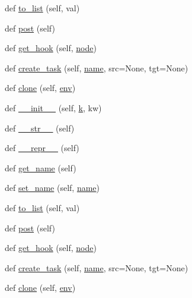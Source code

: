 \begin{DoxyCompactItemize}
\item 
def \hyperlink{classwaflib_1_1_task_gen_1_1task__gen_a31a9f508654465cd5fe9f3baaaf77ec4}{to\+\_\+list} (self, val)
\item 
def \hyperlink{classwaflib_1_1_task_gen_1_1task__gen_aa00dedae17f7fa03c169f0e4bdab7414}{post} (self)
\item 
def \hyperlink{classwaflib_1_1_task_gen_1_1task__gen_a19b53157d4411479cf8f55e0ef0edfec}{get\+\_\+hook} (self, \hyperlink{structnode}{node})
\item 
def \hyperlink{classwaflib_1_1_task_gen_1_1task__gen_ad432ecefdf2362d1cccf1dad31fac2d3}{create\+\_\+task} (self, \hyperlink{lib_2expat_8h_a1b49b495b59f9e73205b69ad1a2965b0}{name}, src=None, tgt=None)
\item 
def \hyperlink{classwaflib_1_1_task_gen_1_1task__gen_a7b7e036b797a0532ce6be8df951ba048}{clone} (self, \hyperlink{classwaflib_1_1_task_gen_1_1task__gen_a4d6f968ce8718fdf77d46ea3b56def1e}{env})
\item 
def \hyperlink{classwaflib_1_1_task_gen_1_1task__gen_a17ba35bed2219481190d515ffef57404}{\+\_\+\+\_\+init\+\_\+\+\_\+} (self, \hyperlink{rfft2d_test_m_l_8m_adc468c70fb574ebd07287b38d0d0676d}{k}, kw)
\item 
def \hyperlink{classwaflib_1_1_task_gen_1_1task__gen_a48c763160308a6ff809b7048702618b1}{\+\_\+\+\_\+str\+\_\+\+\_\+} (self)
\item 
def \hyperlink{classwaflib_1_1_task_gen_1_1task__gen_a040db536e5d7fe5054c9e9da52f36eb0}{\+\_\+\+\_\+repr\+\_\+\+\_\+} (self)
\item 
def \hyperlink{classwaflib_1_1_task_gen_1_1task__gen_a50370e76b549fc3bd0369c35f4fc1bab}{get\+\_\+name} (self)
\item 
def \hyperlink{classwaflib_1_1_task_gen_1_1task__gen_a79705c7a6b9b09021ee549e428c5a5c1}{set\+\_\+name} (self, \hyperlink{lib_2expat_8h_a1b49b495b59f9e73205b69ad1a2965b0}{name})
\item 
def \hyperlink{classwaflib_1_1_task_gen_1_1task__gen_a31a9f508654465cd5fe9f3baaaf77ec4}{to\+\_\+list} (self, val)
\item 
def \hyperlink{classwaflib_1_1_task_gen_1_1task__gen_aa00dedae17f7fa03c169f0e4bdab7414}{post} (self)
\item 
def \hyperlink{classwaflib_1_1_task_gen_1_1task__gen_a19b53157d4411479cf8f55e0ef0edfec}{get\+\_\+hook} (self, \hyperlink{structnode}{node})
\item 
def \hyperlink{classwaflib_1_1_task_gen_1_1task__gen_ad432ecefdf2362d1cccf1dad31fac2d3}{create\+\_\+task} (self, \hyperlink{lib_2expat_8h_a1b49b495b59f9e73205b69ad1a2965b0}{name}, src=None, tgt=None)
\item 
def \hyperlink{classwaflib_1_1_task_gen_1_1task__gen_a7b7e036b797a0532ce6be8df951ba048}{clone} (self, \hyperlink{classwaflib_1_1_task_gen_1_1task__gen_a4d6f968ce8718fdf77d46ea3b56def1e}{env})
\end{DoxyCompactItemize}
